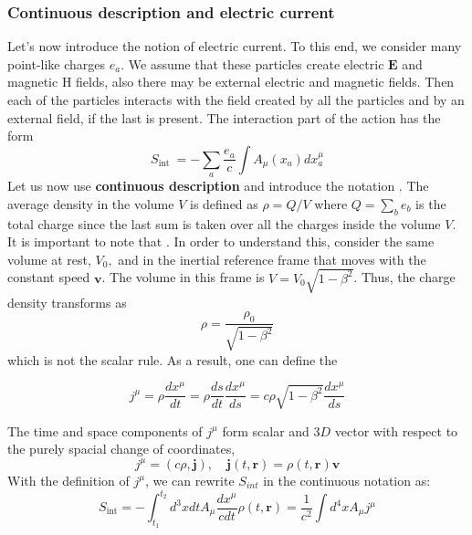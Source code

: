 \subsubsection{Continuous description and electric current}
Let's now introduce the notion of electric current. To this end, we consider many point-like charges $e_a$. We assume that these particles create electric $\mathbf{E}$ and magnetic H fields, also there may be external electric and magnetic fields. Then each of the particles interacts with the field created by all the particles and by an external field, if the last is present. The interaction part of the action has the form
\begin{equation}
S_{\text {int }}=-\sum_{a} \frac{e_{a}}{c} \int A_{\mu}\left(x_{a}\right) d x_{a}^{\mu}
\end{equation}
Let us now use \textbf{continuous description} and introduce the notation . The average density in the volume $V$ is defined as $\rho=Q / V$ where $Q=\sum_{b} e_{b}$ is the total charge since the last sum is taken over all the charges inside the volume $V .$ It is important to note that . In order to understand this, consider the same volume at rest, $V_{0},$ and in the inertial reference frame that moves with the constant speed $\mathbf{v}$. The volume in this frame is $V=V_0\sqrt{1-\beta^2}$. Thus, the charge density transforms as
\begin{equation}
\rho=\frac{\rho_{0}}{\sqrt{1-\beta^{2}}}
\end{equation}
which is not the scalar rule. As a result, one can define the 
\begin{qt}
    \begin{equation}
j^{\mu}=\rho \frac{d x^{\mu}}{d t}=\rho \frac{d s}{d t} \frac{d x^{\mu}}{d s}=c \rho \sqrt{1-\beta^{2}} \frac{d x^{\mu}}{d s}
\end{equation}
\end{qt}
The time and space components of $j^{\mu}$ form scalar and $3 D$ vector with respect to the purely spacial change of coordinates,
$$
j^{\mu}=(c \rho, \mathbf{j}), \quad \mathbf{j}(t, \mathbf{r})=\rho(t, \mathbf{r}) \mathbf{v}
$$
With the definition of $j^{\mu}$, we can rewrite $S_{int}$ in the continuous notation as:
\begin{equation}
S_{\mathrm{int}}=-\int_{t_{1}}^{t_{2}} d^{3} x d t A_{\mu} \frac{d x^{\mu}}{c d t} \rho(t, \mathbf{r})=\frac{1}{c^{2}} \int d^{4} x A_{\mu} j^{\mu}
\label{em-interaction-S}
\end{equation}
